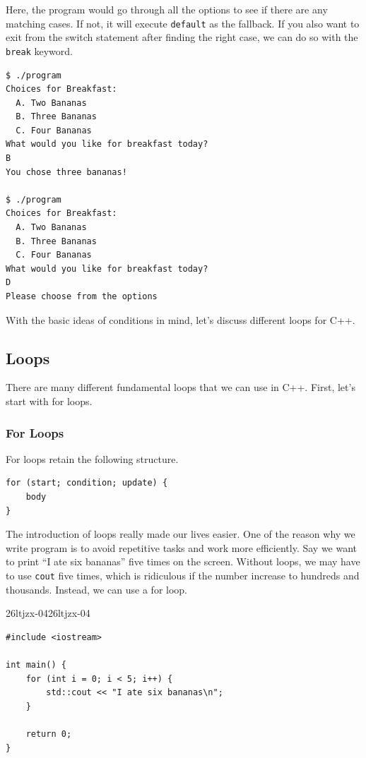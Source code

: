 \documentclass[../../../main.tex]{subfiles}
\begin{document}
Here, the program would go through all the options to see
if there are any matching cases. If not, it will execute
\verb|default| as the fallback. If you also want to exit from the
switch statement after finding the right case, we can do so
with the \verb|break| keyword.

\begin{outputbox}
\begin{lstlisting}[style=basic]
$ ./program
Choices for Breakfast:
  A. Two Bananas
  B. Three Bananas
  C. Four Bananas
What would you like for breakfast today?
B
You chose three bananas!

$ ./program
Choices for Breakfast:
  A. Two Bananas
  B. Three Bananas
  C. Four Bananas
What would you like for breakfast today?
D
Please choose from the options
\end{lstlisting}
\end{outputbox}

With the basic ideas of conditions in mind, let's discuss different
loops for C++.

\subsection{Loops}

There are many different fundamental loops that we can use in C++.
First, let's start with for loops.

\subsubsection{For Loops}

For loops retain the following structure.

\begin{basicbox}
\begin{lstlisting}[style=basic]
for (start; condition; update) {
    body
}
\end{lstlisting}
\end{basicbox}

The introduction of loops really made our lives easier. One of the
reason why we write program is to avoid repetitive tasks and work
more efficiently. Say we want to print ``I ate six bananas'' five
times on the screen. Without loops, we may have to use \verb|cout|
five times, which is ridiculous if the number increase to hundreds
and thousands. Instead, we can use a for loop.

\begin{cppbox}{26ltjzx-04}{26ltjzx-04}
\begin{lstlisting}[style=cppstyle]
#include <iostream>

int main() {
    for (int i = 0; i < 5; i++) {
        std::cout << "I ate six bananas\n";
    }

    return 0;
}
\end{lstlisting}
\end{cppbox}
\end{document}
